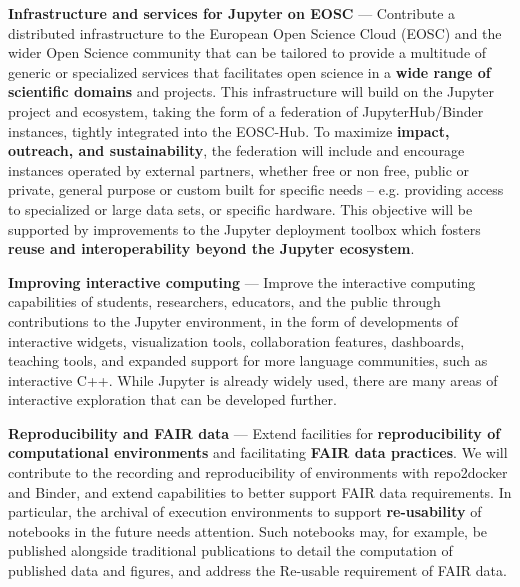 \begin{compactenum}

\item \label{obj:deployment}
  \textbf{Infrastructure and services for Jupyter on EOSC} ---
  Contribute a distributed infrastructure to the European Open Science Cloud
  (EOSC) and the wider Open Science community that can be tailored to
  provide a multitude of generic or specialized services that facilitates
  open science in a \textbf{wide range of scientific domains} and projects.
  This infrastructure will build on the Jupyter project and ecosystem,
  taking the form of a federation of JupyterHub/Binder instances,
  tightly integrated into the EOSC-Hub.
  To maximize \textbf{impact, outreach, and sustainability},
  the federation will include and encourage instances operated by
  external partners, whether free or non free, public or private,
  general purpose or custom built for specific needs -- e.g.
  providing access to specialized or large data sets, or specific hardware.
  This objective will be supported by improvements to the Jupyter
  deployment toolbox which fosters \textbf{reuse and interoperability
    beyond the Jupyter ecosystem}.

\item \label{obj:interactivity}
  \textbf{Improving interactive computing} ---
  Improve the interactive computing capabilities of
  students, researchers, educators, and the public
  through contributions to the Jupyter environment,
  in the form of developments of interactive widgets,
  visualization tools, collaboration features, dashboards,
  teaching tools,
  and expanded support for more language communities,
  such as interactive C++.
  While Jupyter is already widely used,
  there are many areas
  of interactive exploration that can be developed further.

\item \label{obj:reusability}
  \textbf{Reproducibility and FAIR data} ---
  Extend facilities for
  \textbf{reproducibility of computational environments}
  and facilitating \textbf{FAIR data practices}.
  We will contribute to the recording and reproducibility
  of environments with repo2docker and Binder,
  and extend capabilities to better support FAIR
  data requirements. In particular, the archival of execution
  environments to support \textbf{re-usability} of notebooks in the future
  needs attention. Such notebooks may, for example, be published alongside
  traditional publications to detail the computation of published data
  and figures, and address the Re-usable requirement of FAIR data.


\end{compactenum}
